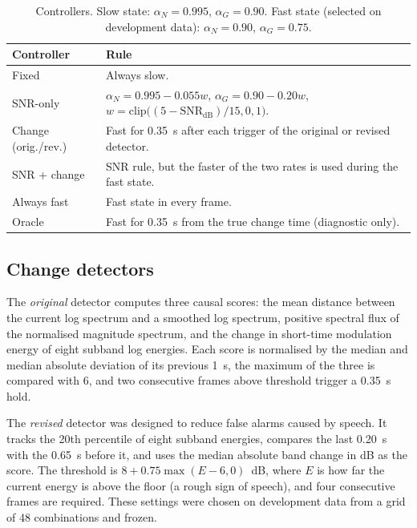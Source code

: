 \documentclass[10pt,conference,a4paper]{IEEEtran}
\begin{document}
\begin{table}[t]
\centering
\caption{Controllers. Slow state: $\alpha_N=0.995$, $\alpha_G=0.90$. Fast state
(selected on development data): $\alpha_N=0.90$, $\alpha_G=0.75$.}
\label{tab:controllers}
\footnotesize
\begin{tabular}{@{}p{2.1cm}p{5.6cm}@{}}
\toprule
Controller & Rule\\
\midrule
Fixed & Always slow.\\
SNR-only & $\alpha_N=0.995-0.055w$, $\alpha_G=0.90-0.20w$, $w=\mathrm{clip}\big((5-\mathrm{SNR_{dB}})/15,0,1\big)$.\\
Change (orig./rev.) & Fast for 0.35~s after each trigger of the original or revised detector.\\
SNR + change & SNR rule, but the faster of the two rates is used during the fast state.\\
Always fast & Fast state in every frame.\\
Oracle & Fast for 0.35~s from the true change time (diagnostic only).\\
\bottomrule
\end{tabular}
\end{table}

\subsection{Change detectors}
The \emph{original} detector computes three causal scores: the mean distance
between the current log spectrum and a smoothed log spectrum, positive spectral
flux of the normalised magnitude spectrum, and the change in short-time
modulation energy of eight subband log energies. Each score is normalised by the
median and median absolute deviation of its previous 1~s, the maximum of the
three is compared with 6, and two consecutive frames above threshold trigger a
0.35~s hold.

The \emph{revised} detector was designed to reduce false alarms caused by speech.
It tracks the 20th percentile of eight subband energies, compares the last
0.20~s with the 0.65~s before it, and uses the median absolute band change in dB
as the score. The threshold is $8+0.75\max(E-6,0)$~dB, where $E$ is how far the
current energy is above the floor (a rough sign of speech), and four consecutive
frames are required. These settings were chosen on development data from a grid
of 48 combinations and frozen.
\end{document}
